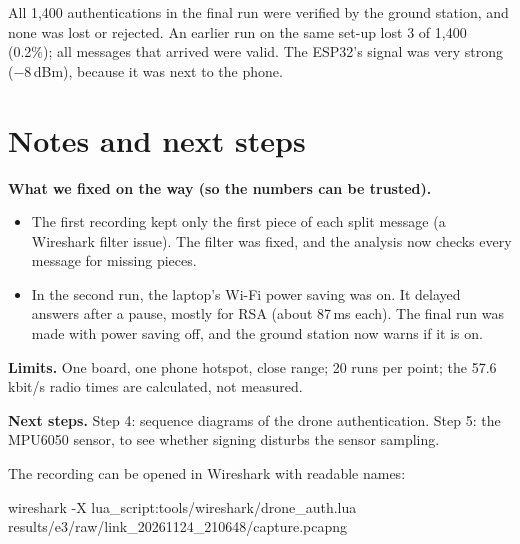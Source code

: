 \documentclass[10pt,a4paper]{article}
\begin{document}
All 1,400 authentications in the final run were verified by the ground station, and none was lost
or rejected. An earlier run on the same set-up lost 3 of 1,400 (0.2\%); all messages that arrived
were valid. The ESP32's signal was very strong ($-8$\,dBm), because it was next to the phone.

\section{Notes and next steps}

\textbf{What we fixed on the way (so the numbers can be trusted).}
\begin{itemize}[nosep]
  \item The first recording kept only the first piece of each split message (a Wireshark filter
        issue). The filter was fixed, and the analysis now checks every message for missing pieces.
  \item In the second run, the laptop's Wi-Fi power saving was on. It delayed answers after a pause,
        mostly for RSA (about 87\,ms each). The final run was made with power saving off, and the
        ground station now warns if it is on.
\end{itemize}

\textbf{Limits.} One board, one phone hotspot, close range; 20 runs per point; the 57.6\,kbit/s
radio times are calculated, not measured.

\textbf{Next steps.} Step 4: sequence diagrams of the drone authentication. Step 5: the MPU6050
sensor, to see whether signing disturbs the sensor sampling.

The recording can be opened in Wireshark with readable names:
\begin{flushleft}\small\ttfamily
wireshark -X lua\_script:tools/wireshark/drone\_auth.lua \\
\hspace*{2em}results/e3/raw/link\_20261124\_210648/capture.pcapng
\end{flushleft}
\end{document}
